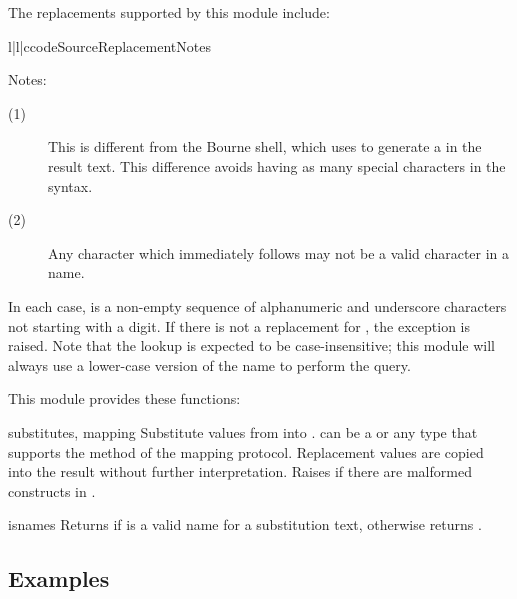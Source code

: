 \documentclass{howto}
\begin{document}
The replacements supported by this module include:

\begin{tableiii}{l|l|c}{code}{Source}{Replacement}{Notes}
\end{tableiii}

\noindent
Notes:
\begin{description}
  \item[(1)]  This is different from the Bourne shell, which uses
              \code{\textbackslash\$} to generate a \character{\$} in
              the result text.  This difference avoids having as many
              special characters in the syntax.

  \item[(2)]  Any character which immediately follows  may
              not be a valid character in a name.
\end{description}

In each case,  is a non-empty sequence of alphanumeric and
underscore characters not starting with a digit.  If there is not a
replacement for , the exception
 is raised.
Note that the lookup is expected to be case-insensitive; this module
will always use a lower-case version of the name to perform the query.

This module provides these functions:

\begin{funcdesc}{substitute}{s, mapping}
  Substitute values from  into .  
  can be a  or any type that supports the 
  method of the mapping protocol.  Replacement
  values are copied into the result without further interpretation.
  Raises  if there are malformed
  constructs in .
\end{funcdesc}

\begin{funcdesc}{isname}{s}
  Returns  if  is a valid name for a substitution
  text, otherwise returns .
\end{funcdesc}


\subsection{Examples}
\end{document}
